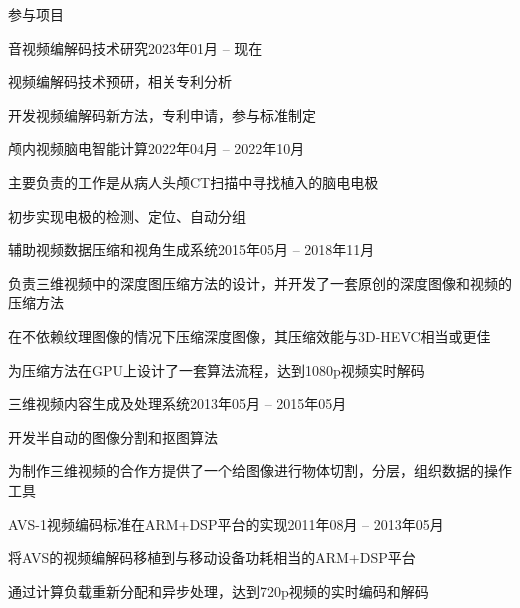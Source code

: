 \documentclass{resume} %
\begin{document}

\begin{rSection}{参与项目}
    \begin{rSubsection}{音视频编解码技术研究}{2023年01月 -- 现在}{}{}
        \item 视频编解码技术预研，相关专利分析
		\item 开发视频编解码新方法，专利申请，参与标准制定
    \end{rSubsection}

    \begin{rSubsection}{颅内视频脑电智能计算}{2022年04月 -- 2022年10月}{}{}
        \item 主要负责的工作是从病人头颅CT扫描中寻找植入的脑电电极
        \item 初步实现电极的检测、定位、自动分组
    \end{rSubsection}

    \begin{rSubsection}{辅助视频数据压缩和视角生成系统}{2015年05月 -- 2018年11月}{}{}
        \item 负责三维视频中的深度图压缩方法的设计，并开发了一套原创的深度图像和视频的压缩方法
        \item 在不依赖纹理图像的情况下压缩深度图像，其压缩效能与3D-HEVC相当或更佳
        \item 为压缩方法在GPU上设计了一套算法流程，达到1080p视频实时解码
    \end{rSubsection}

    \begin{rSubsection}{三维视频内容生成及处理系统}{2013年05月 -- 2015年05月}{}{}
        \item 开发半自动的图像分割和抠图算法
        \item 为制作三维视频的合作方提供了一个给图像进行物体切割，分层，组织数据的操作工具
    \end{rSubsection}

    \begin{rSubsection}{AVS-1视频编码标准在ARM+DSP平台的实现}{2011年08月 -- 2013年05月}{}{}
        \item 将AVS的视频编解码移植到与移动设备功耗相当的ARM+DSP平台
        \item 通过计算负载重新分配和异步处理，达到720p视频的实时编码和解码
    \end{rSubsection}

\end{rSection}
\end{document}
